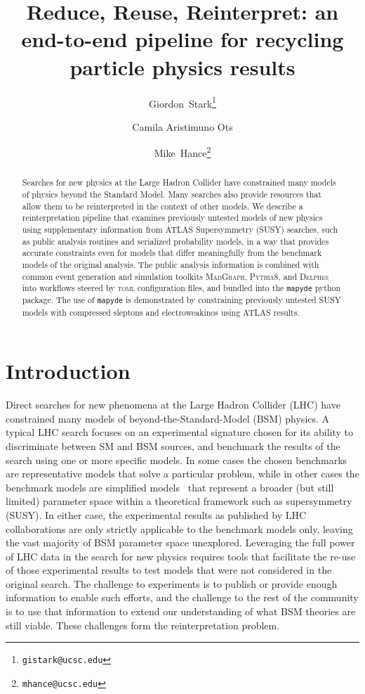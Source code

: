 \documentclass{article}
\title{Reduce, Reuse, Reinterpret: an end-to-end pipeline for recycling particle physics results}
\author[ \,,1]{\orcidaffil{0000-0001-6616-3433}Giordon~Stark\thanks{\texttt{gistark@ucsc.edu}}}
\author[1,2]{Camila Aristimuno Ots}
\author[ \,,1]{\orcidaffil{0000-0001-8392-0934}Mike~Hance\thanks{\texttt{mhance@ucsc.edu}}}
\affil[1]{University of California, Santa Cruz\\ Santa Cruz Institute for Particle Physics\\1156 High Street\\Santa Cruz, CA 95064}
\affil[2]{University of Southern California\\ Liquid Propulsion Laboratory\\ 854 Downey Way, Los Angeles, CA 90089}
\newcommand{\mapyde}{\texttt{mapyde}}
\newcommand{\madgraph}{\textsc{MadGraph}}
\newcommand{\pythia}{\textsc{Pythia8}}
\newcommand{\delphes}{\textsc{Delphes}}
\newcommand{\toml}{\textsc{toml}}
\begin{document}
\maketitle

\begin{abstract}
	Searches for new physics at the Large Hadron Collider have constrained many models of physics beyond the Standard Model.  Many searches also provide resources that allow them to be reinterpreted in the context of other models.  We describe a reinterpretation pipeline that examines previously untested models of new physics using supplementary information from ATLAS Supersymmetry (SUSY) searches, such as public analysis routines and serialized probability models, in a way that provides accurate constraints even for models that differ meaningfully from the benchmark models of the original analysis.  The public analysis information is combined with common event generation and simulation toolkits \madgraph, \pythia, and \delphes{} into workflows steered by \toml{} configuration files, and bundled into the \mapyde{} python package.  The use of \mapyde{} is demonstrated by constraining previously untested SUSY models with compressed sleptons and electroweakinos using ATLAS results.
\end{abstract}


\section{Introduction}
\label{sec:introduction}

Direct searches for new phenomena at the Large Hadron Collider (LHC) have constrained many models of beyond-the-Standard-Model (BSM) physics.  A typical LHC search focuses on an experimental signature chosen for its ability to discriminate between SM and BSM sources, and benchmark the results of the search using one or more specific models.  In some cases the chosen benchmarks are representative models that solve a particular problem, while in other cases the benchmark models are simplified models~\cite{LHCNewPhysicsWorkingGroup:2011mji} that represent a broader (but still limited) parameter space within a theoretical framework such as supersymmetry (SUSY).  In either case, the experimental results as published by LHC collaborations are only strictly applicable to the benchmark models only, leaving the vast majority of BSM parameter space unexplored.  Leveraging the full power of LHC data in the search for new physics requires tools that facilitate the re-use of those experimental results to test models that were not considered in the original search.  The challenge to experiments is to publish or provide enough information to enable such efforts, and the challenge to the rest of the community is to use that information to extend our understanding of what BSM theories are still viable.  These challenges form the reinterpretation problem.
\end{document}

